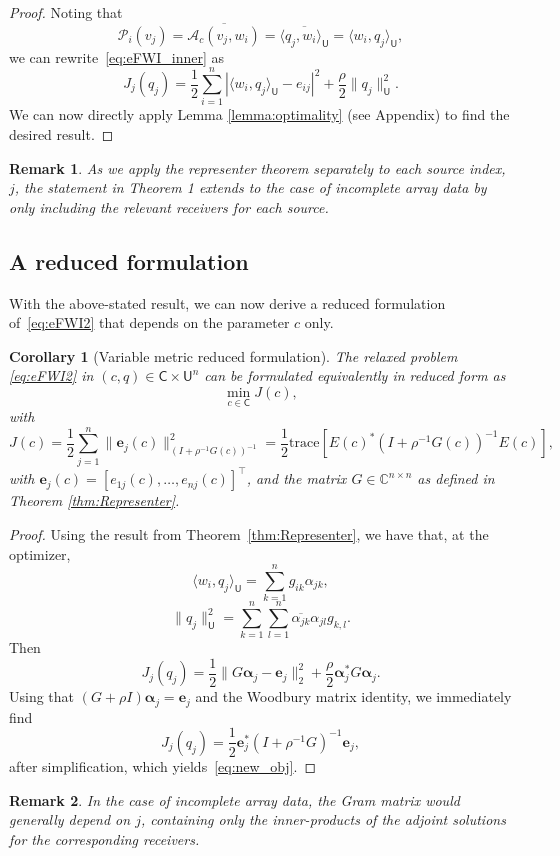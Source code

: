 \documentclass[12pt]{amsart}
\newtheorem{cor}{Corollary}
\newtheorem{rem}{Remark}
\begin{document}
\begin{proof}
Noting that
$$\mathcal{P}_i({v}_j) = \overline{\mathcal{A}_c(v_j, w_i)} = \overline{ \langle q_j, {w}_i \rangle_{\mathsf{U}}}  = \langle {w}_i, q_j \rangle_{\mathsf{U}},$$
we can rewrite~\eqref{eq:eFWI_inner} as
$$J_j(q_j)={\textstyle\frac{1}{2}}\sum_{i=1}^n |\langle w_i,{q_j}\rangle_{\mathsf{U}} - e_{ij}|^2 + {\textstyle{ {\textstyle\frac{\rho}{2}}}}\|q_j\|_{\mathsf{U}}^2.$$
We can now directly apply Lemma \ref{lemma:optimality} (see Appendix) to find the desired result. 
\end{proof}
{%
\begin{rem}
As we apply the representer theorem separately to each source index, $j$, the statement in Theorem 1 extends to the case of incomplete array data by only including the relevant receivers for each source.
\end{rem}
}
\subsection{A reduced formulation}
With the above-stated result, we can now derive a reduced formulation of~\eqref{eq:eFWI2} that depends on the parameter $c$ only.
\begin{cor}
[Variable metric reduced formulation]
\label{thm2}
The relaxed problem \eqref{eq:eFWI2} in $(c, q) \in \mathsf{C}\times \mathsf{U}^n$ can be formulated equivalently in reduced form as
\[
\min_{c\in\mathsf{C}} J(c),
\]
with
\begin{equation}\label{eq:new_obj}
J(c) =  {\textstyle\frac{1}{2}}\sum_{j=1}^n\|\mathbf{e}_j(c)\|_{(I+\rho^{-1}G(c))^{-1}}^2 =   {\textstyle\frac{1}{2}}\text{trace}\left[E(c)^*(I+\rho^{-1}G(c))^{-1}E(c)\right],
\end{equation}
with
${\mathbf{e}}_j(c) = [e_{1j}(c),\ldots,e_{nj}(c)]^\top$, and the matrix $G \in \mathbb{C}^{n\times n}$ as defined in Theorem \ref{thm:Representer}.
\end{cor}
\begin{proof}
Using the result from Theorem~\ref{thm:Representer}, we have that, at the optimizer,
$$\langle w_i, q_j\rangle_\mathsf{U} = \sum_{k=1}
^n g_{ik}\alpha_{jk},$$
$$\|q_j\|_{\mathsf{U}}^2 = \sum_{k=1}^n \sum_{l=1}^n\overline{\alpha_{jk}}\alpha_{jl}g_{k,l}.$$
Then
$$J_j(q_j)=  {\textstyle\frac{1}{2}}\|G\boldsymbol{\alpha}_j - \mathbf{e}_j\|_2^2 +  {\textstyle\frac{\rho}{2}}\boldsymbol{\alpha}_j^* G\boldsymbol{\alpha}_j.$$
Using that $(G + \rho I)\boldsymbol{\alpha}_j = \mathbf{e}_j$ and the Woodbury matrix identity, we immediately find
$$J_j(q_j) =  {\textstyle\frac{1}{2}}\mathbf{e}_j^*(I + \rho^{-1}G)^{-1}\mathbf{e}_j,$$
after simplification, which yields~\eqref{eq:new_obj}.
\end{proof}
{\begin{rem}
In the case of incomplete array data, the Gram matrix would generally depend on $j$, containing only the inner-products of the adjoint solutions for the corresponding receivers.
\end{rem}
}
\end{document}

